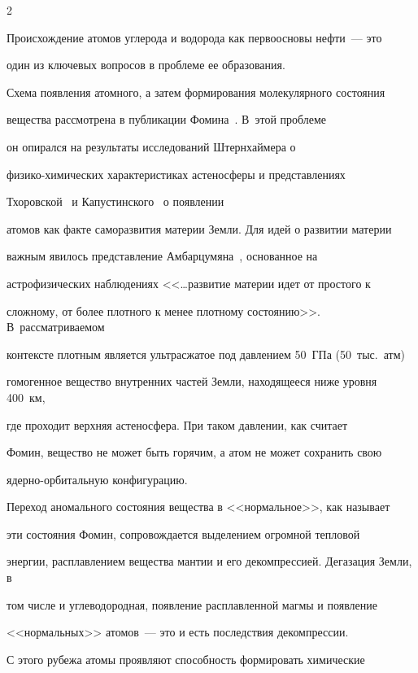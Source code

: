 \begin{multicols}{2}
     

     Происхождение атомов углерода и водорода как первоосновы нефти~--- это 

один из ключевых вопросов в проблеме ее образования.

     

     Схема появления атомного, а затем формирования молекулярного состояния 

вещества рас\-смот\-ре\-на в публикации Фомина~\cite{25s}. В~этой проблеме 

он опирался на результаты исследований Штерн\-хай\-ме\-ра о 

     физико-химических характеристиках астеносферы и представлениях 

Тхоровской~\cite{23s} и Капустинского~\cite{10s} о появлении 

атомов как факте саморазвития материи Земли. Для идей о развитии материи 

важным явилось представление Амбарцумяна~\cite{1s}, основанное на 

астрофизических наблюдениях <<\ldots развитие материи идет от простого к 

сложному, от более плотного к менее плотному состоянию>>. В~рас\-смат\-ри\-ва\-емом 

контексте плотным является ультрасжатое под давлением 50~ГПа (50~тыс.\ атм) 

гомогенное вещество внутренних час\-тей Земли, находящееся ниже уровня 400~км, 

где проходит верхняя астеносфера. При таком давлении, как считает 

Фомин, вещество не может быть горячим, а атом не может сохранить свою 

ядерно-орби\-таль\-ную конфигурацию.

     

     Переход аномального состояния вещества в <<нормальное>>, как называет 

эти состояния Фомин, сопровождается выделением огромной тепловой 

энергии, расплавлением вещества мантии и его декомпрессией. Дегазация Земли, в 

том числе и углеводородная, появление рас\-плав\-лен\-ной магмы и появление 

<<нормальных>> атомов~--- это и есть последствия декомпрессии. 

     

     С этого рубежа атомы проявляют способность формировать химические 


\end{multicols}
